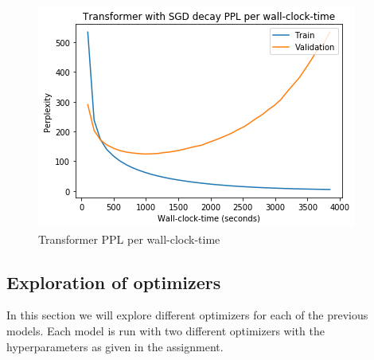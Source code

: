 \begin{figure}[H]
	\centering
	\includegraphics[scale=0.8]{Q4-1_TR_SGDLR_clock.png}
	\caption{Transformer PPL per wall-clock-time}
	\label{fig:fig6}
\end{figure}


\subsection{Exploration of optimizers}
In this section we will explore different optimizers for each of the previous models. Each model is run with two different optimizers with the hyperparameters as given in the assignment. 

